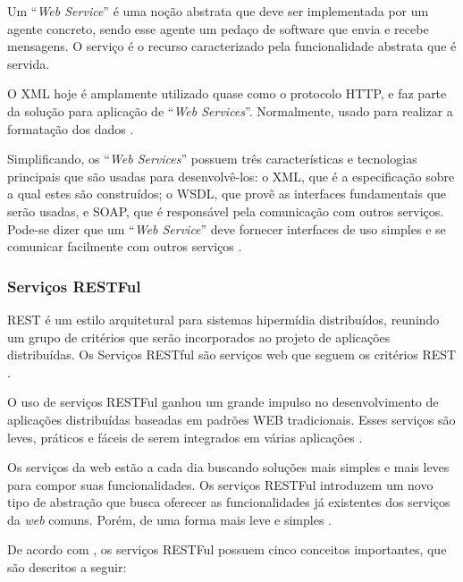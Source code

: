 Um ``\textit{Web Service}'' é uma noção abstrata que deve ser implementada por um agente concreto, sendo esse agente um pedaço de software que envia e recebe mensagens. O serviço é o recurso caracterizado pela funcionalidade abstrata que é servida.

O XML hoje é amplamente utilizado quase como o protocolo HTTP, e faz parte da solução para aplicação de ``\textit{Web Services}''. Normalmente, usado para realizar a formatação dos dados \cite{Alonso:Casati:Kuno:Machiraju:2010}.

Simplificando, os ``\textit{Web Services}'' possuem três características e tecnologias principais que são usadas para desenvolvê-los: o XML, que é a especificação sobre a qual estes são construídos; o WSDL, que provê as interfaces fundamentais que serão usadas, e SOAP, que é responsável pela comunicação com outros serviços. Pode-se dizer que um ``\textit{Web Service}'' deve fornecer interfaces de uso simples e se comunicar facilmente com outros serviços \cite{Newcomer:Lomow:2004}.

\subsubsection{Serviços RESTFul}

REST é um estilo arquitetural para sistemas hipermídia distribuídos, reunindo um grupo de critérios que serão incorporados ao projeto de aplicações distribuídas. Os Serviços RESTful são serviços web que seguem os critérios REST \cite{Filho:2009}.

O uso de serviços RESTFul ganhou um grande impulso no desenvolvimento de aplicações distribuídas baseadas em padrões WEB tradicionais. Esses serviços são leves, práticos e fáceis de serem integrados em várias aplicações \cite{Rosenberg:Curbera:Duftler:Khalaf:2008}.

Os serviços da web estão a cada dia buscando soluções mais simples e mais leves para compor suas funcionalidades. Os serviços RESTFul introduzem um novo tipo de abstração que busca oferecer as funcionalidades já existentes dos serviços da \textit{web} comuns. Porém, de uma forma mais leve e simples \cite{Pautasso:2009}.

De acordo com \cite{Filho:2009}, os serviços RESTFul possuem cinco conceitos importantes, que são descritos a seguir:

